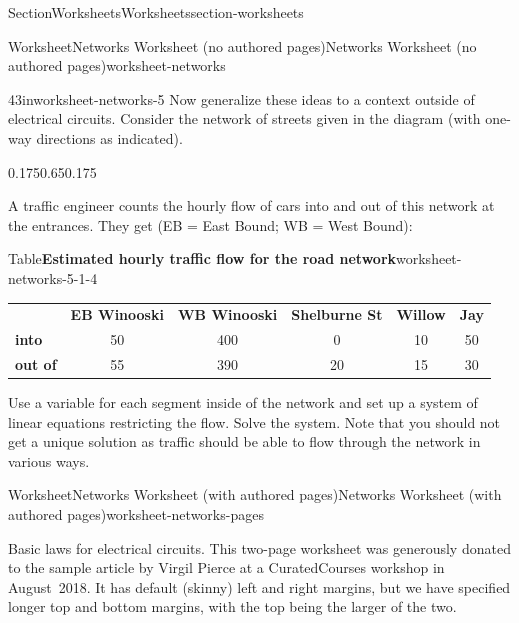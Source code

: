 \documentclass[twoside,10pt,]{article}
\newcommand{\tabularfont}{\relax}
\numberwithin{equation}{section}
\begin{document}
\begin{sectionptx}{Section}{Worksheets}{}{Worksheets}{}{}{section-worksheets}
\begin{worksheet-subsection}{Worksheet}{Networks Worksheet (no authored pages)}{}{Networks Worksheet (no authored pages)}{}{}{worksheet-networks}
\begin{divisionexercise}{4}{}{3in}{worksheet-networks-5}
Now generalize these ideas to a context outside of electrical circuits. Consider the network of streets given in the diagram (with one-way directions as indicated).%
\begin{image}{0.175}{0.65}{0.175}{}%
%
\end{image}%
A traffic engineer counts the hourly flow of cars into and out of this network at the entrances.  They get (EB = East Bound; WB = West Bound):%
\begin{tableptx}{Table}{\textbf{Estimated hourly traffic flow for the road network}}{worksheet-networks-5-1-4}{}%
\centering%
{\tabularfont%
\begin{tabular}{cccccc}
{\bfseries{}}&{\bfseries{}EB Winooski}&{\bfseries{}WB Winooski}&{\bfseries{}Shelburne St}&{\bfseries{}Willow}&{\bfseries{}Jay}\tabularnewline[0pt]
\multicolumn{1}{l}{{\bfseries{}into}}&50&400&0&10&50\tabularnewline[0pt]
\multicolumn{1}{l}{{\bfseries{}out of}}&55&390&20&15&30
\end{tabular}
}%
\end{tableptx}%
Use a variable for each segment inside of the network and set up a system of linear equations restricting the flow. Solve the system.  Note that you should not get a unique solution as traffic should be able to flow through the network in various ways.%
\end{divisionexercise}%
\end{worksheet-subsection}
\restoregeometry
%
%
\typeout{************************************************}
\typeout{************************************************}
%
\begin{worksheet-subsection}{Worksheet}{Networks Worksheet (with authored pages)}{}{Networks Worksheet (with authored pages)}{}{}{worksheet-networks-pages}
\begin{introduction}{Basic laws for electrical circuits.}%
This two-page worksheet was generously donated to the sample article by Virgil Pierce at a CuratedCourses workshop in August~2018.  It has default (skinny) left and right margins, but we have specified longer top and bottom margins, with the top being the larger of the two.%

\end{introduction}
\end{worksheet-subsection}
\end{sectionptx}
\end{document}
